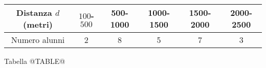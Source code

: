 
\begin{tabular}{ | c | c | c | c | c | c | }
\hline
Distanza $d$ (metri) & {$100$-$500$} & {500-1000} 
 							& {1000-1500} & {1500-2000}
							& {2000-2500}  \\
\hline
Numero alunni & 2 & 8 & 5 & 7 & 3 \\
\hline
\end{tabular}
\vspace{.1cm}

Tabella @TABLE@
\vspace{.2cm}
